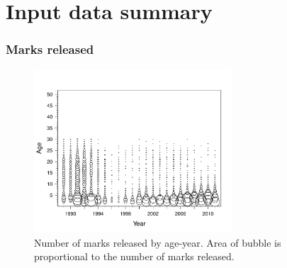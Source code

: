 \documentclass{beamer}
\begin{document}
\section[Input data]{Input data summary} %
\label{sec:input_data_summary}
\begin{frame}[t]\frametitle{Marks released}
	{
	\begin{figure}[htbp]
		\centering
			\includegraphics[height=2.4in]{../../FIGS/ASMR/fig:mta.pdf}
		\caption{Number of marks released by age-year. Area of bubble is proportional to the number of marks released.}
		\label{fig:FIGS_ASMR_fig:mta}
	\end{figure}
	
	}
\end{frame}
%
\end{document}
